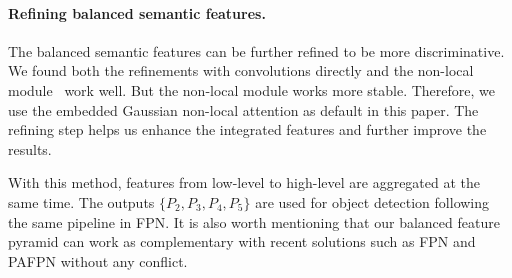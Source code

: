 \documentclass[10pt,twocolumn,letterpaper]{article}
\begin{document}
\vspace{-12pt}
\paragraph{Refining balanced semantic features.}
The balanced semantic features can be further refined to be more discriminative.
We found both the refinements with convolutions directly and the non-local module~\cite{nonlocal} work well.
But the non-local module works more stable.
Therefore, we use the embedded Gaussian non-local attention as default in this paper.
The refining step helps us enhance the integrated features and further improve the results.

With this method, features from low-level to high-level are aggregated at the same time.
The outputs $\{P_{2}, P_{3}, P_{4}, P_{5}\}$ are used for object detection following the same pipeline in FPN.
It is also worth mentioning that our balanced feature pyramid can work as complementary with recent solutions such as FPN and PAFPN without any conflict.
\end{document}
